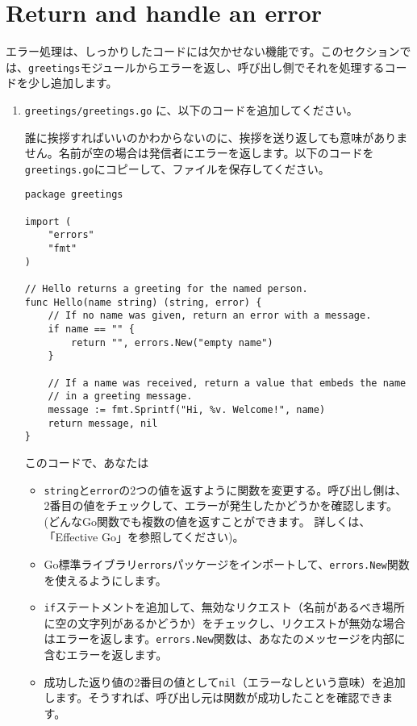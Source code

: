 \section{Return and handle an error}

エラー処理は、しっかりしたコードには欠かせない機能です。このセクションでは、\texttt{greetings}モジュールからエラーを返し、呼び出し側でそれを処理するコードを少し追加します。

\begin{enumerate}
\item \texttt{greetings/greetings.go} に、以下のコードを追加してください。

誰に挨拶すればいいのかわからないのに、挨拶を送り返しても意味がありません。名前が空の場合は発信者にエラーを返します。以下のコードを\texttt{greetings.go}にコピーして、ファイルを保存してください。

\begin{lstlisting}[numbers=none]
package greetings

import (
    "errors"
    "fmt"
)

// Hello returns a greeting for the named person.
func Hello(name string) (string, error) {
    // If no name was given, return an error with a message.
    if name == "" {
        return "", errors.New("empty name")
    }

    // If a name was received, return a value that embeds the name
    // in a greeting message.
    message := fmt.Sprintf("Hi, %v. Welcome!", name)
    return message, nil
}
\end{lstlisting}

このコードで、あなたは
\begin{itemize}
\item \texttt{string}と\texttt{error}の2つの値を返すように関数を変更する。呼び出し側は、2番目の値をチェックして、エラーが発生したかどうかを確認します。(どんなGo関数でも複数の値を返すことができます。 詳しくは、「Effective Go」を参照してください)。
\item Go標準ライブラリ\texttt{errors}パッケージをインポートして、\texttt{errors.New}関数を使えるようにします。
\item \texttt{if}ステートメントを追加して、無効なリクエスト（名前があるべき場所に空の文字列があるかどうか）をチェックし、リクエストが無効な場合はエラーを返します。\texttt{errors.New}関数は、あなたのメッセージを内部に含むエラーを返します。
\item 成功した返り値の2番目の値として\texttt{nil}（エラーなしという意味）を追加します。そうすれば、呼び出し元は関数が成功したことを確認できます。
\end{itemize}



\end{enumerate}
